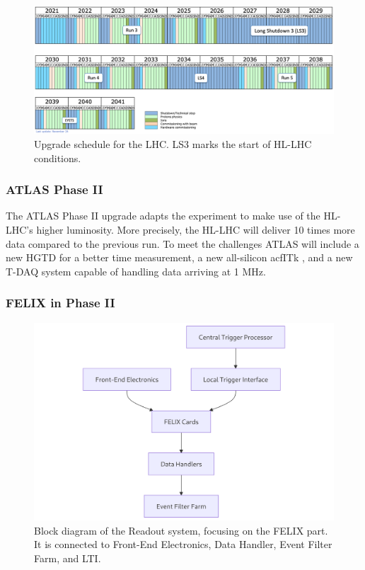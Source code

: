 \begin{figure}[H]
\centering
\includegraphics[width=\textwidth]{images/introduction/LHC-schedule.png}
\caption[Upgrade schedule for the LHC]{Upgrade schedule for the LHC. LS3 marks the start of HL-LHC conditions. \protect\cite{lhc_upgrade_schedule}}
\label{fig:LHC-schedule}
\end{figure}

\subsubsection{\acs{ATLAS} Phase II}

The \acs{ATLAS} Phase II upgrade \cite{Affolder:2799535} adapts the experiment to make use of the \acs{HL-LHC}'s higher luminosity. 
More precisely, the \acs{HL-LHC} will deliver 10 times more data compared to the previous run.  To meet the challenges \acs{ATLAS} will include a new \acf{HGTD} \cite{hgtd-phase2-upgrade} for a better time measurement, a new all-silicon acf{ITk} \cite{atlas-itk-pixel-detector}, and a new \acs{T-DAQ} system capable of handling data arriving at 1 MHz.

\subsubsection{\acs{FELIX} in Phase II}

\begin{figure}[H]
\centering
\includegraphics[width=\textwidth]{images/introduction/felix-block-diagram.png}
\caption[Block diagram of the Readout system]{Block diagram of the Readout system, focusing on the FELIX part. It is connected to Front-End Electronics, Data Handler, Event Filter Farm, and \acf{LTI}.}
\label{fig:felix-block-diagram}
\end{figure}

